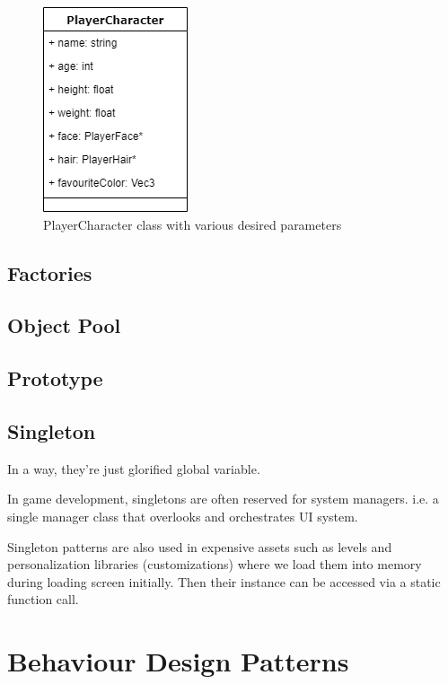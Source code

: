 \documentclass[10pt,letterpaper]{article}
\begin{document}
\begin{multicols}{2}
\begin{figure}[H]
	\centering
	\includegraphics[scale=0.5]{assets/playercharacter_class}
	\caption{PlayerCharacter class with various desired parameters}
	\label{fig:playercharacter-1}
\end{figure}

\subsection{Factories}

\subsection{Object Pool}

\subsection{Prototype}

\subsection{Singleton}

In a way, they're just glorified global variable.

In game development, singletons are often reserved for system managers. i.e. a single manager class that overlooks and orchestrates UI system.

Singleton patterns are also used in expensive assets such as levels and personalization libraries (customizations) where we load them into memory during loading screen initially. Then their instance can be accessed via a static function call.

\section{Behaviour Design Patterns}


\end{multicols}
\end{document}
